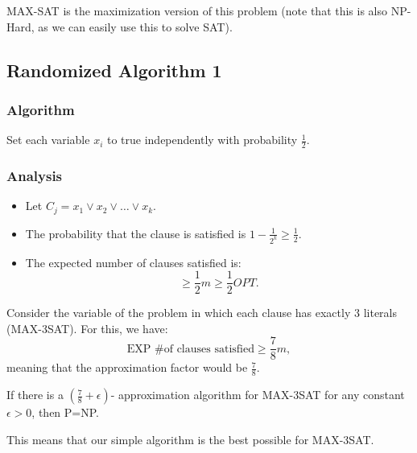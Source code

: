 \documentclass[../main/main.tex]{subfiles}
\begin{document}
MAX-SAT is the maximization version of this problem (note that this is also NP-Hard, as we can easily use this to solve SAT).\\

\subsection{Randomized Algorithm 1}
\subsubsection*{Algorithm}
Set each variable $x_i$ to true independently with probability $\frac{1}{2}$.
\subsubsection*{Analysis} 
\begin{itemize}
	\item Let $C_j=x_1\vee x_2\vee \ldots\vee x_k$. 
	\item The probability that the clause is satisfied is $1-\frac{1}{2^k}\ge \frac{1}{2}$.
	\item The expected number of clauses satisfied is: \[
	\ge \frac{1}{2}m\ge \frac{1}{2}OPT
	.\] 
\end{itemize}
\begin{remark}
	Consider the variable of the problem in which each clause has exactly $3$ literals (MAX-3SAT). For this, we have: \[
	\text{EXP \# of clauses satisfied} \ge \frac{7}{8}m
	,\] meaning that the approximation factor would be $\frac{7}{8}$.
\end{remark}
\begin{theorem}
	If there is a $\left( \frac{7}{8}+\epsilon \right) $- approximation algorithm for MAX-3SAT for any constant $\epsilon>0$, then P=NP.
\end{theorem}
This means that our simple algorithm is the best possible for MAX-3SAT.
\end{document}
